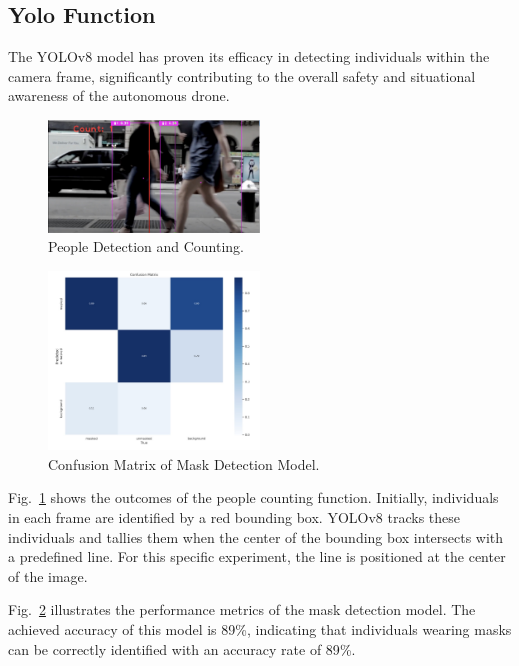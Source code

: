 \subsection{Yolo Function}

The YOLOv8 model has proven its efficacy in detecting individuals within the camera frame, significantly contributing to the overall safety and situational awareness of the autonomous drone.

\begin{figure}[H]
    \centerline{\includegraphics[width=0.5\textwidth]{Figures/Results/people counting.jpg}}
    \caption{People Detection and Counting.}
    \label{fig3c1}
\end{figure}

\begin{figure}[H]
    \centerline{\includegraphics[width=0.5\textwidth]{Figures/Results/Confusion Matrix.jpg}}
    \caption{Confusion Matrix of Mask Detection Model.}
    \label{fig3c2}
\end{figure}

Fig.~\ref{fig3c1} shows the outcomes of the people counting function. Initially, individuals in each frame are identified by a red bounding box. YOLOv8 tracks these individuals and tallies them when the center of the bounding box intersects with a predefined line. For this specific experiment, the line is positioned at the center of the image.

Fig.~\ref{fig3c2} illustrates the performance metrics of the mask detection model. The achieved accuracy of this model is 89{\%}, indicating that individuals wearing masks can be correctly identified with an accuracy rate of 89{\%}.